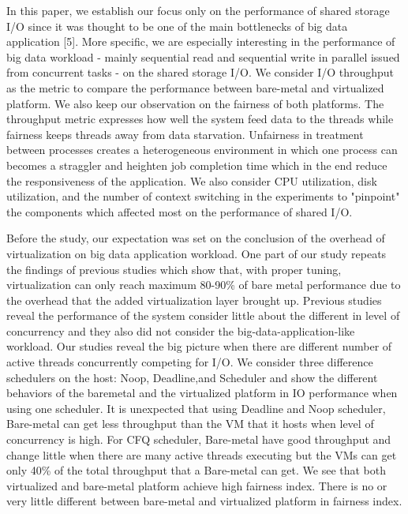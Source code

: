 \documentclass{acmsig}
\begin{document}
In this paper, we establish our focus only on the performance of shared storage I/O since it was thought to be one of the main bottlenecks of big data application [5]. More specific, we are especially interesting in the performance of big data workload - mainly sequential read and sequential write in parallel issued from concurrent tasks - on the shared storage I/O. We consider I/O throughput as the metric to compare the performance between bare-metal and virtualized platform. We also keep our observation on the fairness of both platforms. The throughput metric expresses how well the system feed data to the threads while fairness keeps threads away from data starvation. Unfairness in treatment between processes creates a heterogeneous environment in which one process can becomes a straggler \cite{matei08} and heighten job completion time which in the end reduce the responsiveness of the application. We also consider CPU utilization, disk utilization, and the number of context switching in the experiments to "pinpoint" the components which affected most on the performance of shared I/O.

Before the study, our expectation was set on the conclusion of the overhead of virtualization on big data application workload. One part of our study repeats the findings of previous studies which show that, with proper tuning, virtualization can only reach maximum 80-90\% of bare metal performance due to the overhead that the added virtualization layer brought up. Previous studies reveal the performance of the system consider little about the different in level of concurrency and they also did not consider the big-data-application-like workload. Our studies reveal the big picture when there are different number of active threads concurrently competing for I/O. We consider three difference schedulers on the host: Noop, Deadline,and Scheduler and show the different behaviors of the baremetal and the virtualized platform in IO performance when using one scheduler. It is unexpected that using Deadline and Noop scheduler, Bare-metal can get less throughput than the VM that it hosts when level of concurrency is high. For CFQ scheduler, Bare-metal have good throughput and change little when there are many active threads executing but the VMs can get only 40\% of the total throughput that a Bare-metal can get. We see that both virtualized and bare-metal platform achieve high fairness index. There is no or very little different between bare-metal and virtualized platform in fairness index.
\end{document}
